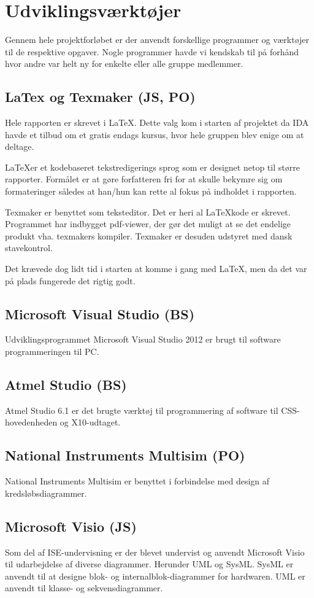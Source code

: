 \chapter{Udviklingsværktøjer}
Gennem hele projektforløbet er der anvendt forskellige programmer og værktøjer til de respektive opgaver. Nogle programmer havde vi kendskab til på forhånd hvor andre var helt ny for enkelte eller alle gruppe medlemmer.

\section{LaTex og Texmaker (JS, PO)}
Hele rapporten er skrevet i \LaTeX. Dette valg kom i starten af projektet da IDA havde et tilbud om et gratis endags kursus, hvor hele gruppen blev enige om at deltage. 

\LaTeX er et kodebaseret tekstredigerings sprog som er designet netop til større rapporter. Formålet er at gøre forfatteren fri for at skulle bekymre sig om formateringer således at han/hun kan rette al fokus på indholdet i rapporten.

Texmaker er benyttet som teksteditor. Det er heri al \LaTeX kode er skrevet. Programmet har indbygget pdf-viewer, der gør det muligt at se det endelige produkt vha. texmakers kompiler. Texmaker er desuden udstyret med dansk stavekontrol.

Det krævede dog lidt tid i starten at komme i gang med \LaTeX, men da det var på plads fungerede det rigtig godt. 

\section{Microsoft Visual Studio (BS)}
Udviklingsprogrammet Microsoft Visual Studio 2012 er brugt til software programmeringen til PC.

\section{Atmel Studio (BS)}
Atmel Studio 6.1 er det brugte værktøj til programmering af software til CSS-hovedenheden og X10-udtaget.

\section{National Instruments Multisim (PO)}
National Instruments Multisim er benyttet i forbindelse med design af kredsløbsdiagrammer. 

\section{Microsoft Visio (JS)} %
Som del af ISE-undervisning er der blevet undervist og anvendt Microsoft Visio til udarbejdelse af diverse diagrammer. Herunder UML og SysML. SysML er anvendt til at designe blok- og internalblok-diagrammer for hardwaren. UML er anvendt til klasse- og sekvensdiagrammer. 

